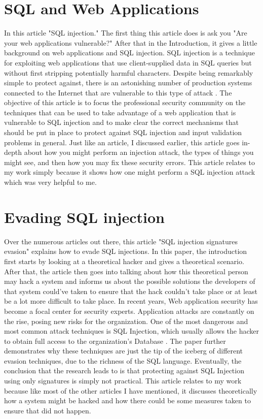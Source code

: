 \section{SQL and Web Applications}
\label{sec:sql & web applications}
In this article "SQL injection." The first thing this article does is ask you "Are your web applications vulnerable?" After that in the Introduction, it gives a little background on web applications and SQL injection. SQL injection is a technique for exploiting web applications that use client-supplied data in SQL queries but without first stripping potentially harmful characters. Despite being remarkably simple to protect against, there is an astonishing number of production systems connected to the Internet that are vulnerable to this type of attack \cite{spett2002sql}.
The objective of this article is to focus the professional security community on the techniques that can be used to take advantage of a web application that is vulnerable to SQL injection and to make clear the correct mechanisms that should be put in place to protect against SQL injection and input validation problems in general. Just like an article, I discussed earlier, this article goes in-depth about how you might perform an injection attack, the types of things you might see, and then how you may fix these security errors. This article relates to my work simply because it shows how one might perform a SQL injection attack which was very helpful to me.


\section{Evading SQL injection}
\label{sec:Evading SQL injection}

Over the numerous articles out there, this article "SQL injection signatures evasion" explains how to evade SQL injections. In this paper, the introduction first starts by looking at a theoretical hacker and gives a theoretical scenario. After that, the article then goes into talking about how this theoretical person may hack a system and informs us about the possible solutions the developers of that system could've taken to ensure that the hack couldn't take place or at least be a lot more difficult to take place. In recent years, Web application security has become a focal center for security experts. Application attacks are constantly on the rise, posing new risks for the organization. One of the most dangerous and most common attack techniques is SQL Injection, which usually allows the hacker to obtain full access to the organization's Database \cite{maor2004sql}.
The paper further demonstrates why these techniques are just the tip of the iceberg of different evasion techniques, due to the richness of the SQL language. Eventually, the conclusion that the research leads to is that protecting against SQL Injection using only signatures is simply not practical. This article relates to my work because like most of the other articles I have mentioned, it discusses theoretically how a system might be hacked and how there could be some measures taken to ensure that did not happen.

